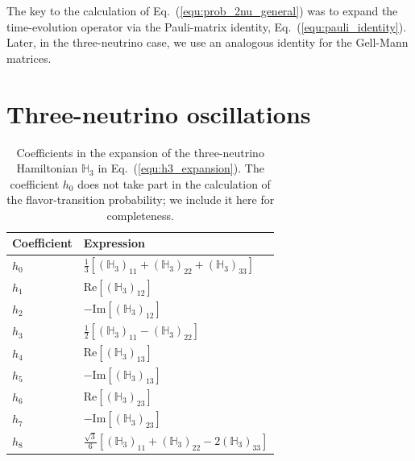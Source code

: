 \documentclass[final,5p,times,twocolumn]{elsarticle}
\newcommand{\eq}{Eq.}
\newcommand{\equ}[1]{\eq~(\ref{equ:#1})}
\begin{document}
The key to the calculation of \equ{prob_2nu_general} was to expand the time-evolution operator via the Pauli-matrix identity, \equ{pauli_identity}.  Later, in the three-neutrino case, we use an analogous identity for the Gell-Mann matrices.




\section{Three-neutrino oscillations}
\label{section:three_flavors}

{\def\arraystretch{1.2}
\begin{table}[t!]
  \begin{tabular}{ll}
   Coefficient & Expression \\
   \hline
   $h_0$ & $\frac{1}{3}\left[\left(\mathbb{H}_3\right)_{11}+\left(\mathbb{H}_3\right)_{22}+\left(\mathbb{H}_3\right)_{33}\right]$ \\
   $h_1$ & $\text{Re}\left[{\left(\mathbb{H}_3\right)_{12}}\right]$ \\
   $h_2$ & $-\text{Im}\left[{\left(\mathbb{H}_3\right)_{12}}\right]$ \\
   $h_3$ & $\frac{1}{2}\left[\left(\mathbb{H}_3\right)_{11}-\left(\mathbb{H}_3\right)_{22} \right]$ \\
   $h_4$ & $\text{Re}\left[{\left(\mathbb{H}_3\right)_{13}}\right]$ \\
   $h_5$ & $-\text{Im}\left[{\left(\mathbb{H}_3\right)_{13}}\right]$ \\
   $h_6$ & $\text{Re}\left[{\left(\mathbb{H}_3\right)_{23}}\right]$ \\
   $h_7$ & $-\text{Im}\left[{\left(\mathbb{H}_3\right)_{23}}\right]$ \\
   $h_8$ & $\frac{\sqrt{3}}{6}\left[\left(\mathbb{H}_3\right)_{11}+\left(\mathbb{H}_3\right)_{22}-2\left(\mathbb{H}_3\right)_{33}\right]$ 
  \end{tabular}
  \caption{\label{tab:h3_coefficients}Coefficients in the expansion of the three-neutrino Hamiltonian $\mathbb{H}_3$ in \equ{h3_expansion}.  The coefficient $h_0$ does not take part in the calculation of the flavor-transition probability; we include it here for completeness.}
\end{table}
}
\end{document}
